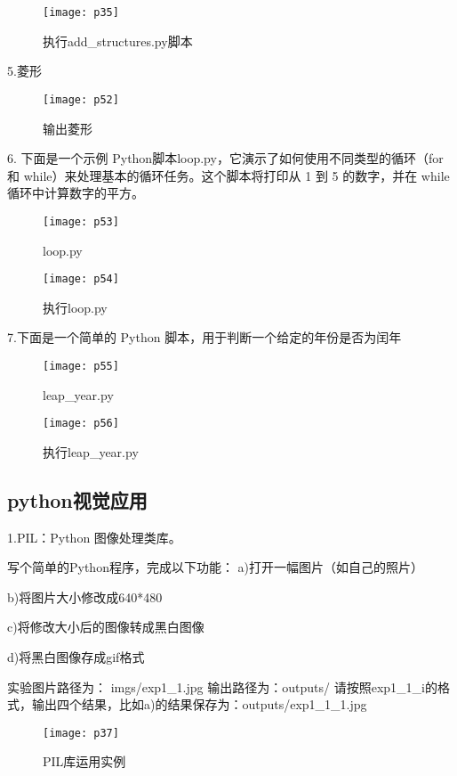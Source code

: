 \documentclass[a4paper ,12pt]{article}
\begin{document}
	\begin{figure}[h]
		\centering
		\texttt{[image: p35]}
		\caption{执行add\_structures.py脚本}
	\end{figure}
	
	5.菱形
	\begin{figure}[h]
		\centering
		\texttt{[image: p52]}
		\caption{输出菱形}
	\end{figure}
	
	
	6.  下面是一个示例 Python脚本loop.py，它演示了如何使用不同类型的循环（for 和 while）来处理基本的循环任务。这个脚本将打印从 1 到 5 的数字，并在 while 循环中计算数字的平方。
		\begin{figure}[h]
		\centering
		\texttt{[image: p53]}
		\caption{loop.py}
	\end{figure}
	
		\begin{figure}[h]
		\centering
		\texttt{[image: p54]}
		\caption{执行loop.py}
	\end{figure}
	
	7.下面是一个简单的 Python 脚本，用于判断一个给定的年份是否为闰年
	
	\begin{figure}[h]
		\centering
		\texttt{[image: p55]}
		\caption{leap\_year.py}
	\end{figure}
	
	\begin{figure}[h]
		\centering
		\texttt{[image: p56]}
		\caption{执行leap\_year.py}
	\end{figure}
	
	\subsection{python视觉应用}
	1.PIL：Python 图像处理类库。
	
	写个简单的Python程序，完成以下功能：
	a)打开一幅图片（如自己的照片）
	
	b)将图片大小修改成640*480
	
	c)将修改大小后的图像转成黑白图像
	
	d)将黑白图像存成gif格式
	
	实验图片路径为：
	imgs/exp1\_1.jpg
	输出路径为：outputs/
	请按照exp1\_1\_i的格式，输出四个结果，比如a)的结果保存为：outputs/exp1\_1\_1.jpg
    
    \begin{figure}[h]
    	\centering
    	\texttt{[image: p37]}
    	\caption{PIL库运用实例}
    \end{figure}
    
\end{document}
